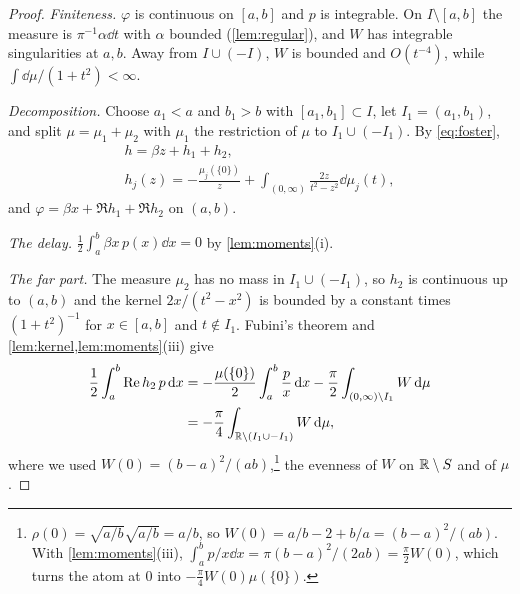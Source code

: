 \begin{proof}
\emph{Finiteness.} $\varphi$ is continuous on $[a,b]$ and $p$ is integrable.
On $I\setminus[a,b]$ the measure is $\pi^{-1}\alpha\dd t$ with $\alpha$
bounded (\cref{lem:regular}), and $W$ has integrable singularities at
$a,b$. Away from $I\cup(-I)$, $W$ is bounded and $O(t^{-4})$, while
$\int\dd\mu/(1+t^2)<\infty$.

\emph{Decomposition.} Choose $a_1<a$ and $b_1>b$ with $[a_1,b_1]\subset I$,
let $I_1=(a_1,b_1)$, and split $\mu=\mu_1+\mu_2$ with $\mu_1$ the restriction
of $\mu$ to $I_1\cup(-I_1)$. By \eqref{eq:foster},
\begin{gather*}
h=\beta z+h_1+h_2,\\
h_j(z)=-\frac{\mu_j(\{0\})}{z}+\int_{(0,\infty)}\frac{2z}{t^2-z^2}\dd\mu_j(t),
\end{gather*}
and $\varphi=\beta x+\Re h_1+\Re h_2$ on $(a,b)$.

\emph{The delay.} $\frac12\int_a^b\beta x\,p(x)\dd x=0$ by
\cref{lem:moments}(i).

\emph{The far part.} The measure $\mu_2$ has no mass in $I_1\cup(-I_1)$, so
$h_2$ is continuous up to $(a,b)$ and the kernel $2x/(t^2-x^2)$ is bounded by
a constant times $(1+t^2)^{-1}$ for $x\in[a,b]$ and $t\notin I_1$. Fubini's
theorem and \cref{lem:kernel,lem:moments}(iii) give
\begin{align*}
\frac12\int_a^b\operatorname{Re} h_2\,p\,\mathrm d x
&=-\frac{\mu(\{0\})}2\int_a^b\frac px\,\mathrm d x-\frac\pi2\int_{(0,\infty)\setminus I_1}W\,\mathrm d\mu\\
&=-\frac\pi4\int_{\mathbb R\setminus(I_1\cup-I_1)}W\,\mathrm d\mu ,
\end{align*}
where we used $W(0)=(b-a)^2/(ab)$,\footnote{$\rho(0)=\sqrt{a/b}\sqrt{a/b}=a/b$, so $W(0)=a/b-2+b/a=(b-a)^2/(ab)$. With \cref{lem:moments}(iii), $\int_a^bp/x\dd x=\pi(b-a)^2/(2ab)=\frac\pi2W(0)$, which turns the atom at $0$ into $-\frac\pi4W(0)\mu(\{0\})$.} the evenness of $W$ on $\mathbb R\setminus S$
and of $\mu$.


\end{proof}
